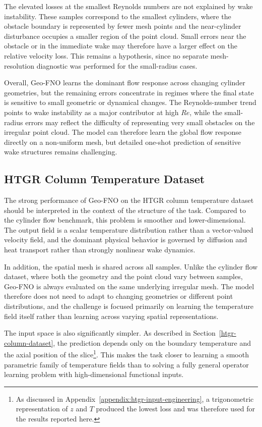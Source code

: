 The elevated losses at the smallest Reynolds numbers are not explained by wake instability. These samples correspond to the smallest cylinders, where the obstacle boundary is represented by fewer mesh points and the near-cylinder disturbance occupies a smaller region of the point cloud. Small errors near the obstacle or in the immediate wake may therefore have a larger effect on the relative velocity loss. This remains a hypothesis, since no separate mesh-resolution diagnostic was performed for the small-radius cases.

Overall, Geo-FNO learns the dominant flow response across changing cylinder geometries, but the remaining errors concentrate in regimes where the final state is sensitive to small geometric or dynamical changes. The Reynolds-number trend points to wake instability as a major contributor at high \(Re\), while the small-radius errors may reflect the difficulty of representing very small obstacles on the irregular point cloud. The model can therefore learn the global flow response directly on a non-uniform mesh, but detailed one-shot prediction of sensitive wake structures remains challenging.

\subsection{HTGR Column Temperature Dataset}

The strong performance of Geo-FNO on the HTGR column temperature dataset should be interpreted in the context of the structure of the task. Compared to the cylinder flow benchmark, this problem is smoother and lower-dimensional. The output field is a scalar temperature distribution rather than a vector-valued velocity field, and the dominant physical behavior is governed by diffusion and heat transport rather than strongly nonlinear wake dynamics.

In addition, the spatial mesh is shared across all samples. Unlike the cylinder flow dataset, where both the geometry and the point cloud vary between samples, Geo-FNO is always evaluated on the same underlying irregular mesh. The model therefore does not need to adapt to changing geometries or different point distributions, and the challenge is focused primarily on learning the temperature field itself rather than learning across varying spatial representations.

The input space is also significantly simpler. As described in Section~\ref{htgr-column-dataset}, the prediction depends only on the boundary temperature and the axial position of the slice\footnote{As discussed in Appendix~\ref{appendix:htgr-input-engineering}, a trigonometric representation of \(z\) and \(T\) produced the lowest loss and was therefore used for the results reported here.}. This makes the task closer to learning a smooth parametric family of temperature fields than to solving a fully general operator learning problem with high-dimensional functional inputs.

